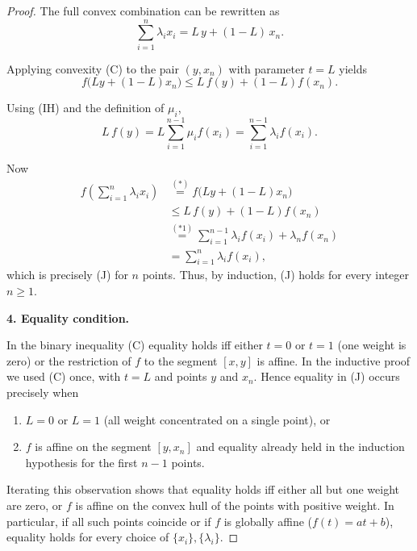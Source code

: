 \begin{proof}
The full convex combination can be rewritten as  
\begin{equation}
\sum_{i=1}^{n}\lambda_{i}x_{i}=L\,y+(1-L)\,x_{n}. \tag{*}
\end{equation}

Applying convexity (C) to the pair \((y,x_{n})\) with parameter \(t=L\) yields  
\begin{equation}
f\bigl(Ly+(1-L)x_{n}\bigr)\le L\,f(y)+(1-L)f(x_{n}). \tag{C2}
\end{equation}

Using (IH) and the definition of \(\mu_{i}\),
\[
L\,f(y)=L\sum_{i=1}^{n-1}\mu_{i}f(x_{i})
       =\sum_{i=1}^{n-1}\lambda_{i}f(x_{i}). \tag{*1}
\]

Now
\[
\begin{aligned}
f\!\left(\sum_{i=1}^{n}\lambda_{i}x_{i}\right)
&\overset{(*)}{=}f\bigl(Ly+(1-L)x_{n}\bigr) \\
&\le L\,f(y)+(1-L)f(x_{n}) \\
&\overset{(*1)}{=}\sum_{i=1}^{n-1}\lambda_{i}f(x_{i})+\lambda_{n}f(x_{n}) \\
&=\sum_{i=1}^{n}\lambda_{i}f(x_{i}),
\end{aligned}
\]
which is precisely (J) for \(n\) points.  
Thus, by induction, (J) holds for every integer \(n\ge1\).

\textbf{4. Equality condition.}  

In the binary inequality (C) equality holds iff either \(t=0\) or \(t=1\) (one
weight is zero) or the restriction of \(f\) to the segment \([x,y]\) is affine.
In the inductive proof we used (C) once, with \(t=L\) and points \(y\) and
\(x_{n}\). Hence equality in (J) occurs precisely when  

\begin{enumerate}
\item \(L=0\) or \(L=1\) (all weight concentrated on a single point), or
\item \(f\) is affine on the segment \([y,x_{n}]\) and equality already held in
the induction hypothesis for the first \(n-1\) points.
\end{enumerate}

Iterating this observation shows that equality holds iff either all but one
weight are zero, or \(f\) is affine on the convex hull of the points with
positive weight. In particular, if all such points coincide or if \(f\) is
globally affine (\(f(t)=at+b\)), equality holds for every choice of
\(\{x_{i}\},\{\lambda_{i}\}\).

\end{proof}